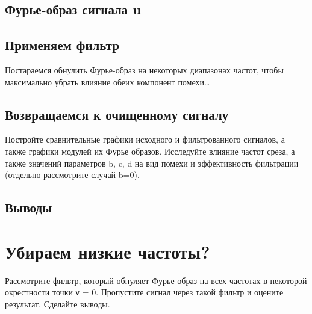 \subsection{Фурье-образ сигнала u}

\subsection{Применяем фильтр}
Постараемся обнулить Фурье-образ на некоторых диапазонах частот, чтобы максимально убрать влияние обеих компонент помехи\dots

\subsection{Возвращаемся к очищенному сигналу}
Постройте сравнительные графики исходного и фильтрованного сигналов, а также графики модулей их Фурье образов. Исследуйте влияние частот среза, а также значений параметров b, c, d
на вид помехи и эффективность фильтрации (отдельно рассмотрите случай b=0).

\subsection{Выводы}



\section{Убираем низкие частоты?}

Рассмотрите фильтр, который обнуляет Фурье-образ
на всех частотах в некоторой окрестности точки ν = 0. Пропустите сигнал через
такой фильтр и оцените результат. Сделайте выводы.





\endinput